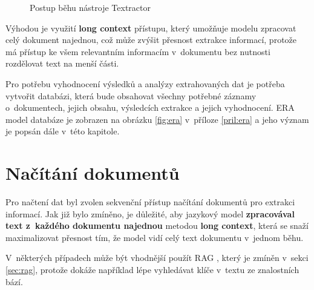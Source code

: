 \documentclass[czech, bc, kiv, he, iso690numb, pdf]{fasthesis}
\newlength{\pipeNodeW}
\begin{document}
\begin{figure}[h!]
    \centering
{}
\noindent{}
\caption{Postup běhu nástroje Textractor}
\label{fig:tikz-vyvojak}
\end{figure}

Výhodou je využití \textbf{long context} přístupu, který umožňuje modelu zpracovat celý dokument najednou, což může zvýšit přesnost extrakce informací, protože má přístup ke všem relevantním informacím v~dokumentu bez nutnosti rozdělovat text na menší části.

Pro potřebu vyhodnocení výsledků a analýzy extrahovaných dat je potřeba vytvořit databázi, která bude obsahovat všechny potřebné záznamy o~dokumentech, jejich obsahu, výsledcích extrakce a jejich vyhodnocení. ERA model databáze je zobrazen na obrázku \ref{fig:era} v~příloze \ref{pril:era} a jeho význam je popsán dále v~této kapitole.

\section{Načítání dokumentů}
Pro načtení dat byl zvolen sekvenční přístup načítání dokumentů pro extrakci informací. Jak již bylo zmíněno, je důležité, aby jazykový model \textbf{zpracovával text z~každého dokumentu najednou} metodou \textbf{long context}, která se snaží maximalizovat přesnost tím, že model vidí celý text dokumentu v~jednom běhu.

V~některých případech může být vhodnější použít RAG \cite{cancer-relative-medical-attributes}, který je zmíněn v~sekci \ref{sec:rag}, protože dokáže například lépe vyhledávat klíče v~textu ze znalostních bází.
\end{document}
